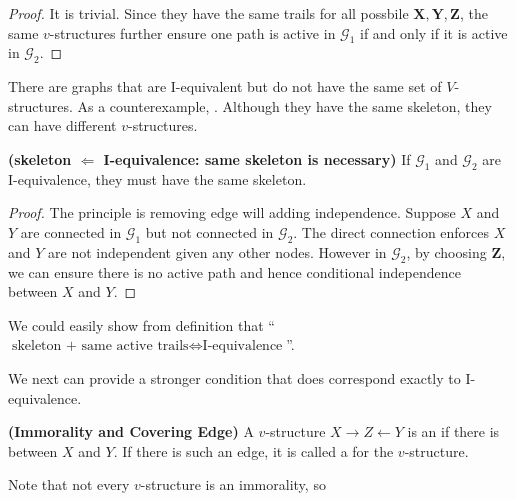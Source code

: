 \documentclass{article}
\newcommand{\bfs}[1]{\textbf{({#1}) }}
\begin{document}
\begin{proof}
It is trivial. Since they have the same trails for all possbile $\boldsymbol{X},\boldsymbol{Y},\boldsymbol{Z}$, the same  $v$-structures further ensure one path is active in $\mathcal{G}_{1}$ if and only if it is active in  $\mathcal{G}_{2}$.
\end{proof}
\begin{rema}
 There are graphs that are I-equivalent but do not have the same set of $V$-structures. As a counterexample, . Although they have the same skeleton, they can have different $v$-structures.
\end{rema}
\begin{thma}\bfs{skeleton $\Leftarrow$ I-equivalence: same skeleton is necessary}
If  $\mathcal{G}_{1}$ and $\mathcal{G}_{2}$ are I-equivalence, they must have the same skeleton.
\end{thma}
\begin{proof}The principle is removing edge will adding independence.
 Suppose $X$ and $Y$ are connected in $\mathcal{G}_{1}$  but not connected in $\mathcal{G}_{2}$. The direct connection enforces $X$ and $Y$ are not independent given any other nodes. However in $\mathcal{G}_{2}$, by choosing $\boldsymbol{Z}$, we can ensure there is no active path and hence conditional independence between $X$ and $Y$.
\end{proof}
\begin{rema}We could easily show from definition that
``$\text{skeleton + same active trails}  \Longleftrightarrow \text{I-equivalence}$''.
\end{rema}

We next can provide a stronger condition that does correspond exactly to I-equivalence.

\begin{defa}\bfs{Immorality and Covering Edge}\label{def:immor}
A $v$-structure $X \rightarrow Z \leftarrow Y$ is an  if there is  between $X$ and $Y$. If there is such an edge, it is called a  for the $v$-structure.
\end{defa}
\begin{rema} Note that not every $v$-structure is an immorality, so \\
\centerline{}
\end{rema}
\end{document}
